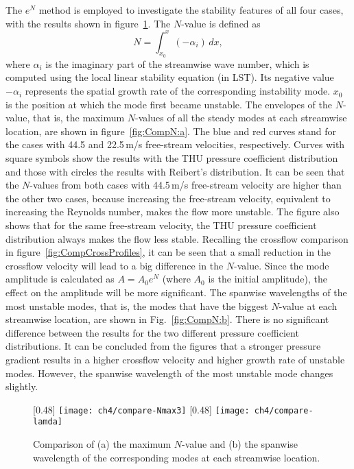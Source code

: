 The $e^N$ method is employed to investigate the stability features of all  four cases, with  the results  shown in figure~\ref{fig:CompN}. The $N$-value is defined as
\begin{equation}\label{e:eNdef}
  N=\int_{x_0}^x( -\alpha_i)\,dx,
\end{equation}
where  $\alpha_i$ is the imaginary part of the streamwise wave number, which is computed using the local linear stability equation (in LST). Its negative value $-\alpha_i$ represents the spatial growth rate of the corresponding instability mode. $x_0$ is the position at which the mode first became unstable. The envelopes of the $N$-value, that is, the maximum $N$-values of all the steady modes at each streamwise location, are shown in figure~\ref{fig:CompN:a}. The blue and red curves stand for the cases with 44.5 and 22.5\,m/s free-stream velocities, respectively. Curves with square symbols show the results with the THU pressure coefficient distribution and those with circles the results with Reibert's distribution. It can be seen that the $N$-values from both cases with 44.5\,m/s free-stream velocity are higher than the other two cases, because increasing the free-stream velocity, equivalent to increasing the Reynolds number, makes the flow more unstable. The figure also shows that for the same free-stream velocity, the THU pressure coefficient distribution always makes the flow less stable. Recalling the crossflow comparison in figure~\ref{fig:CompCrossProfiles}, it can be seen that a small reduction in the crossflow velocity will lead to a big difference in the $N$-value. Since the mode amplitude is calculated as $A=A_0e^{N}$ (where $A_0$ is the initial amplitude), the effect on the amplitude will be more significant. The spanwise wavelengths of the most unstable modes, that is, the modes that have the biggest $N$-value at each streamwise location, are shown in Fig.~\ref{fig:CompN:b}. There is no significant difference between the results for the two different pressure coefficient distributions. It can be concluded from the figures that a stronger pressure gradient results in a higher crossflow velocity and higher growth rate of unstable modes. However, the spanwise wavelength of the most unstable mode changes slightly.
\begin{figure}
\centering
\subcaptionbox{           %
\label{fig:CompN:a}} [0.48\linewidth]%
{\texttt{[image: ch4/compare-Nmax3]}}
\subcaptionbox{           %
\label{fig:CompN:b}} [0.48\linewidth] %
{\texttt{[image: ch4/compare-lamda]}}
\caption{Comparison of (a) the maximum $N$-value and (b) the spanwise wavelength of the corresponding modes at each streamwise location.}
\label{fig:CompN} %
\end{figure}

